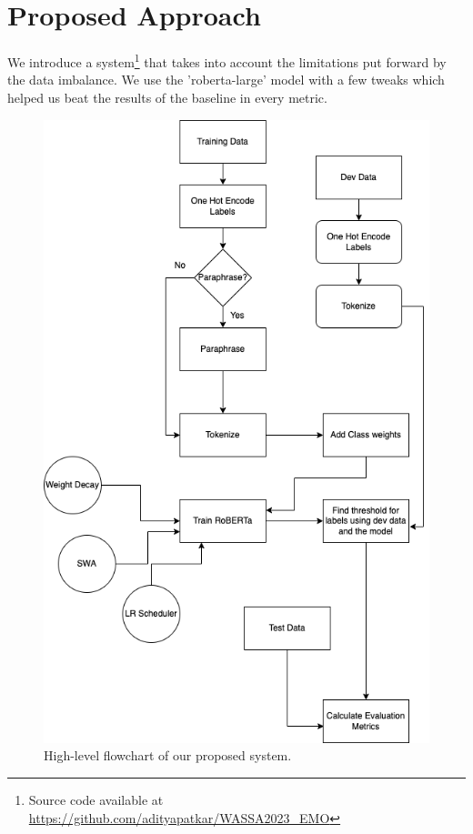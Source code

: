 \documentclass[11pt]{article}
\begin{document}
\section{Proposed Approach}

We introduce a system\footnote{Source code available at \url{https://github.com/adityapatkar/WASSA2023_EMO}} that takes into account the limitations put forward by the data imbalance. We use the 'roberta-large' model with a few tweaks which helped us beat the results of the baseline in every metric.

\begin{figure}[bhp]
\includegraphics[width=\columnwidth]{flowchart.png}
\caption{High-level flowchart of our proposed system.}
\label{fig:system_chart}
\end{figure}
\end{document}
